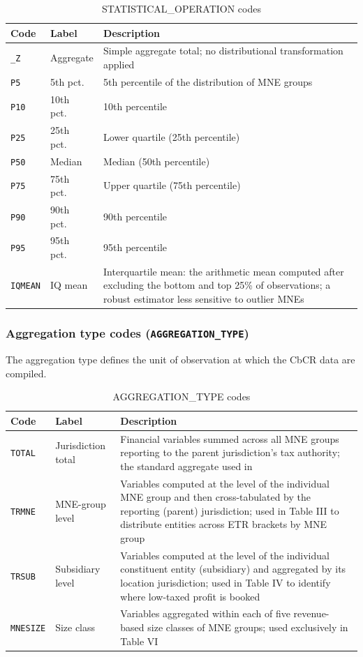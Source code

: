 \documentclass[11pt,a4paper]{article}
\newcommand{\code}[1]{\texttt{#1}}
\begin{document}
\begin{table}[H]
\centering
\caption{STATISTICAL\_OPERATION codes}
\label{tab:statops}
\begin{tabular}{@{}llp{9.5cm}@{}}
\toprule
Code & Label & Description \\
\midrule
\code{\_Z} & Aggregate & Simple aggregate total; no distributional transformation applied \\
\code{P5} & 5th pct.\ & 5th percentile of the distribution of MNE groups \\
\code{P10} & 10th pct.\ & 10th percentile \\
\code{P25} & 25th pct.\ & Lower quartile (25th percentile) \\
\code{P50} & Median & Median (50th percentile) \\
\code{P75} & 75th pct.\ & Upper quartile (75th percentile) \\
\code{P90} & 90th pct.\ & 90th percentile \\
\code{P95} & 95th pct.\ & 95th percentile \\
\code{IQMEAN} & IQ mean & Interquartile mean: the arithmetic mean computed after excluding the bottom and top 25\% of observations; a robust estimator less sensitive to outlier MNEs \\
\bottomrule
\end{tabular}
\end{table}

\subsubsection{Aggregation type codes (\texttt{AGGREGATION\_TYPE})}

The aggregation type defines the unit of observation at which the CbCR data are compiled. 

\begin{table}[H]
\centering
\caption{AGGREGATION\_TYPE codes}
\label{tab:aggtypes}
\begin{tabular}{@{}llp{8cm}@{}}
\toprule
Code & Label & Description \\
\midrule
\code{TOTAL} & Jurisdiction total & Financial variables summed across all MNE groups reporting to the parent jurisdiction's tax authority; the standard aggregate used in \citet{barake2022} \\
\code{TRMNE} & MNE-group level & Variables computed at the level of the individual MNE group and then cross-tabulated by the reporting (parent) jurisdiction; used in Table III to distribute entities across ETR brackets by MNE group \\
\code{TRSUB} & Subsidiary level & Variables computed at the level of the individual constituent entity (subsidiary) and aggregated by its location jurisdiction; used in Table IV to identify where low-taxed profit is booked \\
\code{MNESIZE} & Size class & Variables aggregated within each of five revenue-based size classes of MNE groups; used exclusively in Table VI \\
\bottomrule
\end{tabular}
\end{table}
\end{document}
